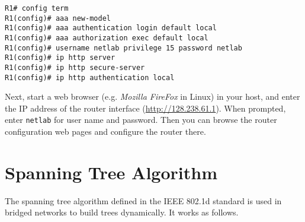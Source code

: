 \documentclass{../UTNetLab}
\begin{document}
    \begin{lstlisting}[language={cisco},emph={netlab}]
R1# config term
R1(config)# aaa new-model
R1(config)# aaa authentication login default local
R1(config)# aaa authorization exec default local
R1(config)# username netlab privilege 15 password netlab
R1(config)# ip http server
R1(config)# ip http secure-server
R1(config)# ip http authentication local
    \end{lstlisting}

    Next, start a web browser (e.g. \textit{Mozilla FireFox} in Linux) in your host, and enter the IP address of the router interface (\url{http://128.238.61.1}).
    When prompted, enter \texttt{netlab} for user name and password.
    Then you can browse the router configuration web pages and configure the router there.


\newpage
\appendix

\section{Spanning Tree Algorithm}
\label{appendix:spanningTree}
    The spanning tree algorithm defined in the IEEE 802.1d standard is used in bridged networks to build trees dynamically.
    It works as follows.
\end{document}
